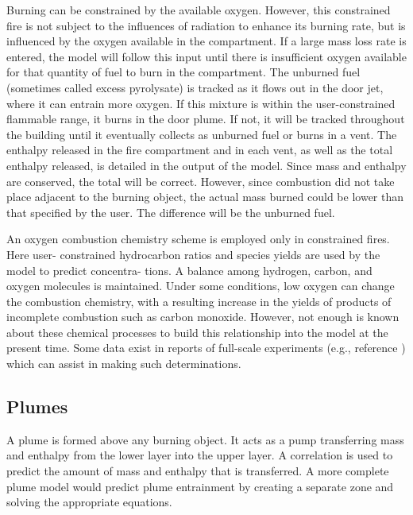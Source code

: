 Burning can be constrained by the available oxygen.  However, this constrained fire is not
subject to the influences of radiation to enhance its burning rate, but is influenced by the oxygen
available in the compartment.  If a large mass loss rate is entered, the model will follow this
input until there is insufficient oxygen available for that quantity of fuel to burn in the
compartment.  The unburned fuel (sometimes called excess pyrolysate) is tracked as it flows out
in the door jet, where it can entrain more oxygen.  If this mixture is within the user-constrained
flammable range, it burns in the door plume.  If not, it will be tracked throughout the building
until it eventually collects as unburned fuel or burns in a vent.  The enthalpy released in the fire
compartment and in each vent, as well as the total enthalpy released, is detailed in the output of
the model.  Since mass and enthalpy are conserved, the total will be correct.  However, since
combustion did not take place adjacent to the burning object, the actual mass burned could be
lower than that specified by the user.  The difference will be the unburned fuel.

An oxygen combustion chemistry scheme is employed only in constrained fires.  Here user-
constrained hydrocarbon ratios and species yields are used by the model to predict concentra-
tions.  A balance among hydrogen, carbon, and oxygen molecules is maintained.  Under some
conditions, low oxygen can change the combustion chemistry, with a resulting increase in the
yields of products of incomplete combustion such as carbon monoxide. However, not enough is
known about these chemical processes to build this relationship into the model at the present
time.  Some data exist in reports of full-scale experiments (e.g., reference \cite{Lee:1982}) which can assist in making such determinations.

\subsection{Plumes}

A plume is formed above any burning object.  It acts as a pump transferring mass and enthalpy
from the lower layer into the upper layer.  A correlation is used to predict the amount of mass
and enthalpy that is transferred.  A more complete plume model would predict plume
entrainment by creating a separate zone and solving the appropriate equations.

